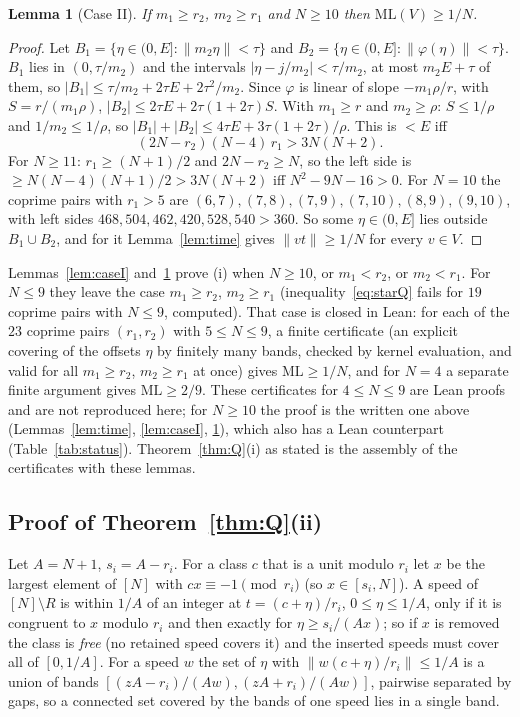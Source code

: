\documentclass[11pt]{article}
\newtheorem{lemma}[theorem]{Lemma}
\theoremstyle{definition}
\theoremstyle{remark}
\newcommand{\nd}[1]{\lVert #1\rVert}
\newcommand{\ML}{\mathrm{ML}}
\begin{document}
\begin{lemma}[Case II]\label{lem:caseII}
If $m_1\ge r_2$, $m_2\ge r_1$ and $N\ge10$ then $\ML(V)\ge1/N$.
\end{lemma}
\begin{proof}
Let $B_1=\{\eta\in(0,E]:\nd{m_2\eta}<\tau\}$ and $B_2=\{\eta\in(0,E]:\nd{\varphi(\eta)}<\tau\}$. $B_1$ lies in $(0,\tau/m_2)$ and the intervals $|\eta-j/m_2|<\tau/m_2$, at most $m_2E+\tau$ of them, so $|B_1|\le\tau/m_2+2\tau E+2\tau^2/m_2$. Since $\varphi$ is linear of slope $-m_1\rho/r$, with $S=r/(m_1\rho)$, $|B_2|\le2\tau E+2\tau(1+2\tau)S$. With $m_1\ge r$ and $m_2\ge\rho$: $S\le1/\rho$ and $1/m_2\le1/\rho$, so $|B_1|+|B_2|\le4\tau E+3\tau(1+2\tau)/\rho$. This is $<E$ iff
\begin{equation}\label{eq:starQ}
(2N-r_2)(N-4)\,r_1>3N(N+2).
\end{equation}
For $N\ge11$: $r_1\ge(N+1)/2$ and $2N-r_2\ge N$, so the left side is $\ge N(N-4)(N+1)/2>3N(N+2)$ iff $N^2-9N-16>0$. For $N=10$ the coprime pairs with $r_1>5$ are $(6,7),(7,8),(7,9),(7,10),(8,9),(9,10)$, with left sides $468,504,462,420,528,540>360$. So some $\eta\in(0,E]$ lies outside $B_1\cup B_2$, and for it Lemma~\ref{lem:time} gives $\nd{vt}\ge1/N$ for every $v\in V$.
\end{proof}
Lemmas~\ref{lem:caseI} and~\ref{lem:caseII} prove (i) when $N\ge10$, or $m_1<r_2$, or $m_2<r_1$. For $N\le9$ they leave the case $m_1\ge r_2$, $m_2\ge r_1$ (inequality~\eqref{eq:starQ} fails for $19$ coprime pairs with $N\le9$, computed). That case is closed in Lean: for each of the $23$ coprime pairs $(r_1,r_2)$ with $5\le N\le9$, a finite certificate (an explicit covering of the offsets $\eta$ by finitely many bands, checked by kernel evaluation, and valid for all $m_1\ge r_2$, $m_2\ge r_1$ at once) gives $\ML\ge1/N$, and for $N=4$ a separate finite argument gives $\ML\ge2/9$. These certificates for $4\le N\le9$ are Lean proofs and are not reproduced here; for $N\ge10$ the proof is the written one above (Lemmas~\ref{lem:time}, \ref{lem:caseI}, \ref{lem:caseII}), which also has a Lean counterpart (Table~\ref{tab:status}). Theorem~\ref{thm:Q}(i) as stated is the assembly of the certificates with these lemmas.

\subsection{Proof of Theorem~\ref{thm:Q}(ii)}
Let $A=N+1$, $s_i=A-r_i$. For a class $c$ that is a unit modulo $r_i$ let $x$ be the largest element of $[N]$ with $cx\equiv-1\pmod{r_i}$ (so $x\in[s_i,N]$). A speed of $[N]\setminus R$ is within $1/A$ of an integer at $t=(c+\eta)/r_i$, $0\le\eta\le1/A$, only if it is congruent to $x$ modulo $r_i$ and then exactly for $\eta\ge s_i/(Ax)$; so if $x$ is removed the class is \emph{free} (no retained speed covers it) and the inserted speeds must cover all of $[0,1/A]$. For a speed $w$ the set of $\eta$ with $\nd{w(c+\eta)/r_i}\le1/A$ is a union of bands $[(zA-r_i)/(Aw),(zA+r_i)/(Aw)]$, pairwise separated by gaps, so a connected set covered by the bands of one speed lies in a single band.
\end{document}
